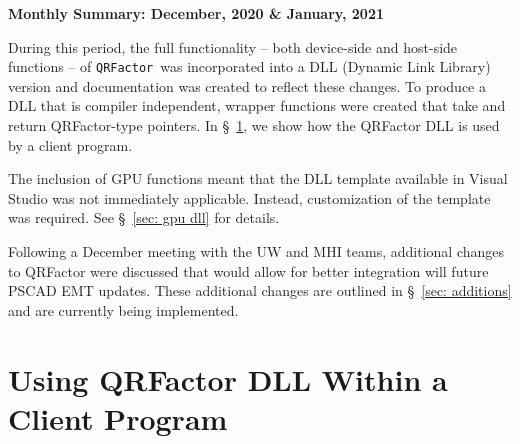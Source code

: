 \documentclass[11pt,letterpaper]{article}
\newcommand{\qrf}{\texttt{QRFactor}}
\begin{document}
\begin{center}
    {\Large \bf Monthly Summary: December, 2020 \& January, 2021}
\end{center}

During this period, the full functionality -- both device-side and host-side functions -- of \qrf~was incorporated into a DLL (Dynamic Link Library) version and documentation was created to reflect these changes. To produce a DLL that is compiler independent, wrapper functions were created that take and return QRFactor-type pointers. In \S\!\!~\ref{sec: client}, we show how the QRFactor DLL is used by a client program.

The inclusion of GPU functions meant that the DLL template available in Visual Studio was not immediately applicable. Instead, customization of the template was required. See \S\!\!~\ref{sec: gpu dll} for details.

Following a December meeting with the UW and MHI teams, additional changes to QRFactor were discussed that would allow for better integration will future PSCAD EMT updates. These additional changes are outlined in \S\!\!~\ref{sec: additions} and are currently being implemented.

\section{Using QRFactor DLL Within a Client Program}
\label{sec: client}
\end{document}
